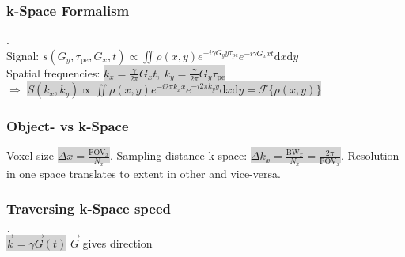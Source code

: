\documentclass[9pt]{article}
\newcommand{\grey}[1]{\setlength{\fboxsep}{0pt}\colorbox{lightgrey}{#1}}
\newcommand{\dif}{\mathrm{d}}
\newcommand{\fcal}{\mathcal{F}}
\begin{document}
\begin{multicols}{2}
\subsubsection{k-Space Formalism}
.\\
Signal: $s(G_y,\tau_\mathrm{pe},G_x,t) \propto \iint \rho(x,y) e^{-i\gamma G_y y \tau_\mathrm{pe}} e^{-i\gamma G_x x t} \dif x \dif y$ \\
Spatial frequencies: \grey{$k_x = \frac{\gamma}{2\pi}G_xt, \ k_y=\frac{\gamma}{2\pi}G_y\tau_\mathrm{pe}$} \\
$\Rightarrow$ \grey{$S(k_x, k_y) \propto \iint \rho(x,y)e^{-i2\pi k_xx}e^{-i2\pi k_yy} \dif x\dif y = \fcal\{\rho(x,y)\}$}

\subsubsection{Object- vs k-Space}
Voxel size \grey{$\Delta x = \frac{\mathrm{FOV}_x}{N_x}$}. Sampling distance k-space: \grey{$\Delta k_x = \frac{\mathrm{BW}_x}{N_x} = \frac{2\pi}{\mathrm{FOV}_x}$}. Resolution in one space translates to extent in other and vice-versa.

\subsubsection{Traversing k-Space speed} 
\grey{$\dot{\vec k} = \gamma \vec G(t)$} $\vec{G}$ gives direction


\end{multicols}
\end{document}
